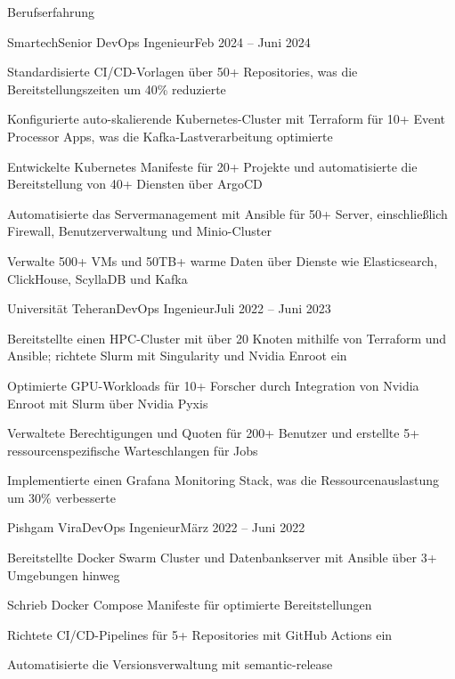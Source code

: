 \documentclass[]{main}
\begin{document}
\begin{section}{Berufserfahrung}
 \begin{subsection}{Smartech}{Senior DevOps Ingenieur}{Feb 2024 -- Juni 2024}{}
     \item Standardisierte CI/CD-Vorlagen über 50+ Repositories, was die Bereitstellungszeiten um 40\% reduzierte
     \item Konfigurierte auto-skalierende Kubernetes-Cluster mit Terraform für 10+ Event Processor Apps, was die Kafka-Lastverarbeitung optimierte
     \item Entwickelte Kubernetes Manifeste für 20+ Projekte und automatisierte die Bereitstellung von 40+ Diensten über ArgoCD
     \item Automatisierte das Servermanagement mit Ansible für 50+ Server, einschließlich Firewall, Benutzerverwaltung und Minio-Cluster
     \item Verwalte 500+ VMs und 50TB+ warme Daten über Dienste wie Elasticsearch, ClickHouse, ScyllaDB und Kafka
 \end{subsection}

 \begin{subsection}{Universität Teheran}{DevOps Ingenieur}{Juli 2022 -- Juni 2023}{}
     \item Bereitstellte einen HPC-Cluster mit über 20 Knoten mithilfe von Terraform und Ansible; richtete Slurm mit Singularity und Nvidia Enroot ein
     \item Optimierte GPU-Workloads für 10+ Forscher durch Integration von Nvidia Enroot mit Slurm über Nvidia Pyxis
     \item Verwaltete Berechtigungen und Quoten für 200+ Benutzer und erstellte 5+ ressourcenspezifische Warteschlangen für Jobs
     \item Implementierte einen Grafana Monitoring Stack, was die Ressourcenauslastung um 30\% verbesserte
 \end{subsection}

 \begin{subsection}{Pishgam Vira}{DevOps Ingenieur}{März 2022 -- Juni 2022}{}
     \item Bereitstellte Docker Swarm Cluster und Datenbankserver mit Ansible über 3+ Umgebungen hinweg
     \item Schrieb Docker Compose Manifeste für optimierte Bereitstellungen
     \item Richtete CI/CD-Pipelines für 5+ Repositories mit GitHub Actions ein
     \item Automatisierte die Versionsverwaltung mit semantic-release
 \end{subsection}


\end{section}
\end{document}
